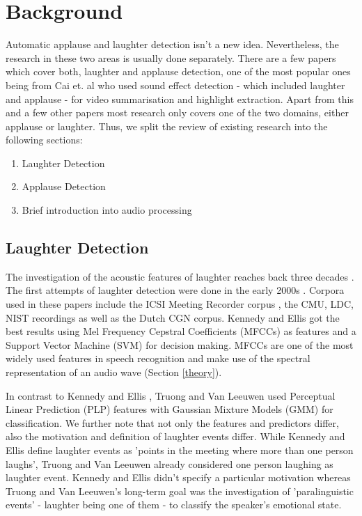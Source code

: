 \documentclass[bsc,frontabs,parskip,deptreport]{infthesis}
\begin{document}
\chapter{Background}
Automatic applause and laughter detection isn't a new idea. Nevertheless, the research in these two areas is usually done separately. There are a few papers which cover both, laughter and applause detection, one of the most popular ones being from Cai et. al \cite{cai2003highlight} who used sound effect detection - which included laughter and applause - for video summarisation and highlight extraction.
Apart from this and a few other papers most research only covers one of the two domains, either applause or laughter. Thus, we split the review of existing research into the following sections:
\begin{enumerate}
  \item Laughter Detection
  \item Applause Detection
  \item Brief introduction into audio processing
\end{enumerate}


\section{Laughter Detection}
The investigation of the acoustic features of laughter reaches back three decades \cite{bickley1992acoustic}. The first attempts of laughter detection were done in the early 2000s \cite{kennedy2004laughter, truong2005automatic}.
Corpora used in these papers include the ICSI Meeting Recorder corpus \cite{morgan2001meeting}, the CMU, LDC, NIST recordings as well as the Dutch CGN corpus. 
Kennedy and Ellis \cite{kennedy2004laughter} got the best results using Mel Frequency Cepstral Coefficients (MFCCs) as features and a Support Vector Machine (SVM) for decision making. 
MFCCs are one of the most widely used features in speech recognition and make use of the spectral representation of an audio wave (Section \ref{theory}).

In contrast to Kennedy and Ellis \cite{kennedy2004laughter}, Truong and Van Leeuwen \cite{truong2005automatic} used Perceptual Linear Prediction (PLP) features with Gaussian Mixture Models (GMM) for classification. 
We further note that not only the features and predictors differ, also the motivation and definition of laughter events differ. 
While Kennedy and Ellis define laughter events as 'points in the meeting where more than one person laughs', Truong and Van Leeuwen already considered one person laughing as laughter event.
Kennedy and Ellis didn't specify a particular motivation whereas Truong and Van Leeuwen's long-term goal was the investigation of 'paralinguistic events' - laughter being one of them - to classify the speaker's emotional state.   
\end{document}

